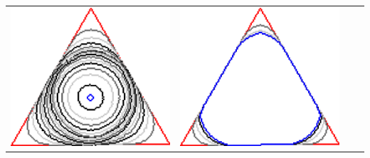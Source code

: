 \begin{frame}
\begin{tabular}{cccc}
\includegraphics[scale=0.13]{figures/non-submodular-elastica/level-effect/triangle-l4.png}&
\includegraphics[scale=0.13]{figures/non-submodular-elastica/level-effect/triangle-l5.png}\\[2em]

\end{tabular}
\end{frame}
